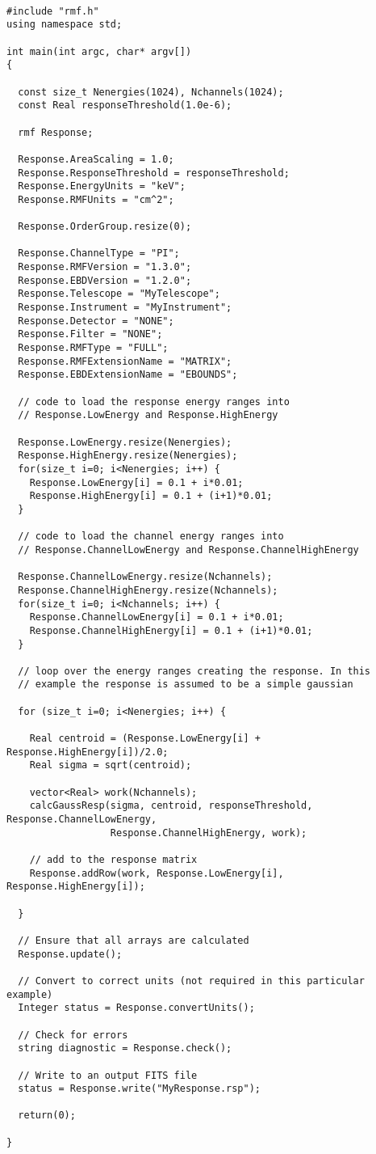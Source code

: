 \documentclass[11pt]{book}
\begin{document}
\begin{verbatim}

#include "rmf.h"
using namespace std;

int main(int argc, char* argv[])
{

  const size_t Nenergies(1024), Nchannels(1024);
  const Real responseThreshold(1.0e-6);

  rmf Response;

  Response.AreaScaling = 1.0;
  Response.ResponseThreshold = responseThreshold;
  Response.EnergyUnits = "keV";
  Response.RMFUnits = "cm^2";

  Response.OrderGroup.resize(0);

  Response.ChannelType = "PI";
  Response.RMFVersion = "1.3.0";
  Response.EBDVersion = "1.2.0";
  Response.Telescope = "MyTelescope";
  Response.Instrument = "MyInstrument";
  Response.Detector = "NONE";
  Response.Filter = "NONE";
  Response.RMFType = "FULL";
  Response.RMFExtensionName = "MATRIX";
  Response.EBDExtensionName = "EBOUNDS";

  // code to load the response energy ranges into
  // Response.LowEnergy and Response.HighEnergy

  Response.LowEnergy.resize(Nenergies);
  Response.HighEnergy.resize(Nenergies);  
  for(size_t i=0; i<Nenergies; i++) {
    Response.LowEnergy[i] = 0.1 + i*0.01;
    Response.HighEnergy[i] = 0.1 + (i+1)*0.01;
  }

  // code to load the channel energy ranges into
  // Response.ChannelLowEnergy and Response.ChannelHighEnergy

  Response.ChannelLowEnergy.resize(Nchannels);
  Response.ChannelHighEnergy.resize(Nchannels);  
  for(size_t i=0; i<Nchannels; i++) {
    Response.ChannelLowEnergy[i] = 0.1 + i*0.01;
    Response.ChannelHighEnergy[i] = 0.1 + (i+1)*0.01;
  }

  // loop over the energy ranges creating the response. In this
  // example the response is assumed to be a simple gaussian

  for (size_t i=0; i<Nenergies; i++) {

    Real centroid = (Response.LowEnergy[i] + Response.HighEnergy[i])/2.0;
    Real sigma = sqrt(centroid);

    vector<Real> work(Nchannels);
    calcGaussResp(sigma, centroid, responseThreshold, Response.ChannelLowEnergy,
                  Response.ChannelHighEnergy, work);

    // add to the response matrix
    Response.addRow(work, Response.LowEnergy[i], Response.HighEnergy[i]);
 
  }

  // Ensure that all arrays are calculated
  Response.update();

  // Convert to correct units (not required in this particular example)
  Integer status = Response.convertUnits();

  // Check for errors
  string diagnostic = Response.check();

  // Write to an output FITS file
  status = Response.write("MyResponse.rsp");

  return(0);

}
\end{verbatim}
\end{document}
